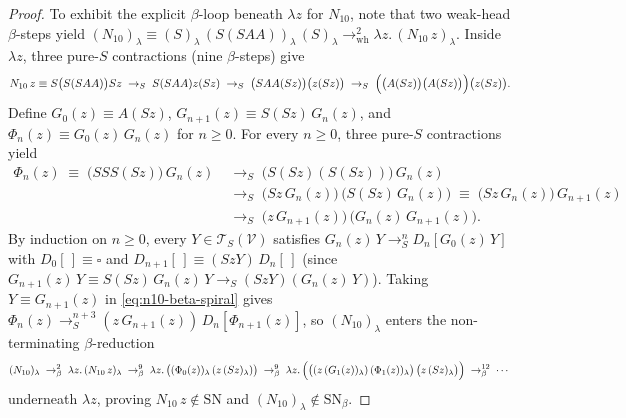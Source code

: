 \documentclass[11pt,reqno]{amsart}
\numberwithin{equation}{section}
\theoremstyle{plain}
\theoremstyle{definition}
\theoremstyle{remark}
\newcommand{\TSV}{\mathcal{T}_S(\mathcal{V})}
\newcommand{\SN}{\mathrm{SN}}
\newcommand{\redS}{\to_S}
\begin{document}
\begin{proof}
To exhibit the explicit $\beta$-loop beneath $\lambda z$ for $N_{10}$, note that two weak-head $\beta$-steps yield $(N_{10})_\lambda \equiv (S)_\lambda\,(S(S A A))_\lambda\,(S)_\lambda \to_{\mathrm{wh}}^2 \lambda z.\, (N_{10}\,z)_\lambda$. Inside $\lambda z$, three pure-$S$ contractions (nine $\beta$-steps) give
\[
  N_{10}\,z \equiv S\bigl(S(S A A)\bigr)S z \;\redS\; S(S A A)z(S z) \;\redS\; \bigl(S A A (S z)\bigr)\bigl(z(S z)\bigr) \;\redS\; \Bigl(\bigl(A(S z)\bigr)\bigl(A(S z)\bigr)\Bigr)\bigl(z(S z)\bigr).
\]
Define $G_0(z) \equiv A(S z)$, $G_{n+1}(z) \equiv S(S z)\,G_n(z)$, and $\Phi_n(z) \equiv G_0(z)\,G_n(z)$ for $n \ge 0$. For every $n \ge 0$, three pure-$S$ contractions yield
\begin{equation}\label{eq:n10-beta-spiral}
\begin{aligned}
  \Phi_n(z) \;\equiv\; \bigl(S S S (S z)\bigr)\,G_n(z)
  &\;\redS\; \bigl(S(S z)(S(S z))\bigr)\,G_n(z) \\
  &\;\redS\; \bigl(S z\,G_n(z)\bigr)\,\bigl(S(S z)\,G_n(z)\bigr) \;\equiv\; \bigl(S z\,G_n(z)\bigr)\,G_{n+1}(z) \\
  &\;\redS\; \bigl(z\,G_{n+1}(z)\bigr)\,\bigl(G_n(z)\,G_{n+1}(z)\bigr).
\end{aligned}
\end{equation}
By induction on $n \ge 0$, every $Y \in \TSV$ satisfies $G_n(z)\,Y \redS^n D_n[G_0(z)\,Y]$ with $D_0[\,] \equiv \square$ and $D_{n+1}[\,] \equiv (S z Y)\,D_n[\,]$ (since $G_{n+1}(z)\,Y \equiv S(S z)\,G_n(z)\,Y \redS (S z Y)(G_n(z)\,Y)$). Taking $Y \equiv G_{n+1}(z)$ in \eqref{eq:n10-beta-spiral} gives $\Phi_n(z) \redS^{n+3} (z\,G_{n+1}(z))\,D_n[\Phi_{n+1}(z)]$, so $(N_{10})_\lambda$ enters the non-terminating $\beta$-reduction
\[
  (N_{10})_\lambda \;\to_\beta^2\; \lambda z.\, (N_{10}\,z)_\lambda \;\to_\beta^9\; \lambda z.\, \bigl((\Phi_0(z))_\lambda\,(z\,(S z)_\lambda)\bigr) \;\to_\beta^9\; \lambda z.\, \Bigl(\bigl((z\,(G_1(z))_\lambda)\,(\Phi_1(z))_\lambda\bigr)\,\bigl(z\,(S z)_\lambda\bigr)\Bigr) \;\to_\beta^{12}\; \cdots
\]
underneath $\lambda z$, proving $N_{10}\,z \notin \SN$ and $(N_{10})_\lambda \notin \SN_\beta$.


\end{proof}
\end{document}
